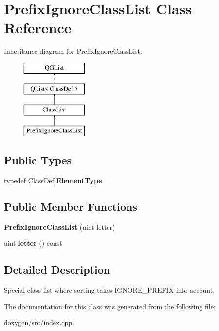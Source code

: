 \hypertarget{class_prefix_ignore_class_list}{}\section{Prefix\+Ignore\+Class\+List Class Reference}
\label{class_prefix_ignore_class_list}
Inheritance diagram for Prefix\+Ignore\+Class\+List\+:\begin{figure}[H]
\begin{center}
\leavevmode
\includegraphics[height=4.000000cm]{class_prefix_ignore_class_list}
\end{center}
\end{figure}
\subsection*{Public Types}
\begin{DoxyCompactItemize}
\item 
\mbox{\label{class_prefix_ignore_class_list_a2987c6ab03907fefdc45089f4bf1fabd}} 
typedef \mbox{\hyperlink{class_class_def}{Class\+Def}} {\bfseries Element\+Type}
\end{DoxyCompactItemize}
\subsection*{Public Member Functions}
\begin{DoxyCompactItemize}
\item 
\mbox{\label{class_prefix_ignore_class_list_a37620d2982498ae7bad7c15cecd9d8f9}} 
{\bfseries Prefix\+Ignore\+Class\+List} (uint letter)
\item 
\mbox{\label{class_prefix_ignore_class_list_a7a0ac3743d6fa66782eedee1a7432360}} 
uint {\bfseries letter} () const
\end{DoxyCompactItemize}


\subsection{Detailed Description}
Special class list where sorting takes I\+G\+N\+O\+R\+E\+\_\+\+P\+R\+E\+F\+IX into account. 

The documentation for this class was generated from the following file\+:\begin{DoxyCompactItemize}
\item 
doxygen/src/\mbox{\hyperlink{index_8cpp}{index.\+cpp}}\end{DoxyCompactItemize}
